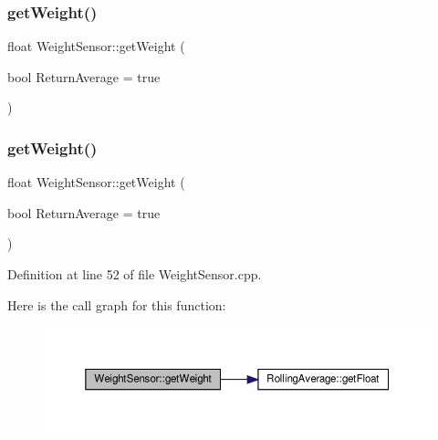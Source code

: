 \mbox{\label{class_weight_sensor_a0a42742e1516e6723b1246e789ba9253}} 
\subsubsection{\texorpdfstring{get\+Weight()}{getWeight()}\hspace{0.1cm}{\footnotesize\ttfamily [1/2]}}
{\footnotesize\ttfamily float Weight\+Sensor\+::get\+Weight (\begin{DoxyParamCaption}\item[{bool}]{Return\+Average = {\ttfamily true} }\end{DoxyParamCaption})}

\mbox{\label{class_weight_sensor_a0a42742e1516e6723b1246e789ba9253}} 
\subsubsection{\texorpdfstring{get\+Weight()}{getWeight()}\hspace{0.1cm}{\footnotesize\ttfamily [2/2]}}
{\footnotesize\ttfamily float Weight\+Sensor\+::get\+Weight (\begin{DoxyParamCaption}\item[{bool}]{Return\+Average = {\ttfamily true} }\end{DoxyParamCaption})}



Definition at line 52 of file Weight\+Sensor.\+cpp.

Here is the call graph for this function\+:
\nopagebreak
\begin{figure}[H]
\begin{center}
\leavevmode
\includegraphics[width=350pt]{class_weight_sensor_a0a42742e1516e6723b1246e789ba9253_cgraph}
\end{center}
\end{figure}
\mbox{\label{class_weight_sensor_a859e380f3bac2453e8659e281b39ce31}} 
